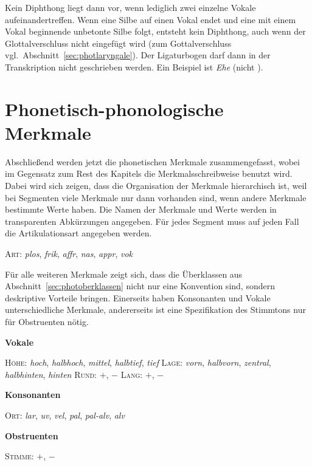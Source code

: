 Kein Diphthong liegt dann vor, wenn lediglich zwei einzelne Vokale aufeinandertreffen.
Wenn eine Silbe auf einen Vokal endet und eine mit einem Vokal beginnende unbetonte Silbe folgt, entsteht kein Diphthong, auch wenn der Glottalverschluss nicht eingefügt wird (zum Gottalverschluss vgl.\ Abschnitt~\ref{sec:photlaryngale}).
Der Ligaturbogen darf dann in der Transkription nicht geschrieben werden.
Ein Beispiel ist \textit{Ehe} \textipa{[Pe:@]} (nicht \Ast\textipa{[P\t{e@}]}).

\section{Phonetisch-phonologische Merkmale}

\label{sec:photpholmerkmale}

Abschließend werden jetzt die phonetischen Merkmale zusammengefasst, wobei im Gegensatz zum Rest des Kapitels die Merkmalsschreibweise benutzt wird.
Dabei wird sich zeigen, dass die Organisation der Merkmale hierarchisch ist, weil bei Segmenten viele Merkmale nur dann vorhanden sind, wenn andere Merkmale bestimmte Werte haben.
Die Namen der Merkmale und Werte werden in transparenten Abkürzungen angegeben.
Für jedes Segment muss auf jeden Fall die Artikulationsart angegeben werden.

\begin{exe}
	\ex \textsc{Art}: \textit{plos}, \textit{frik}, \textit{affr}, \textit{nas}, \textit{appr}, \textit{vok}
\end{exe}

Für alle weiteren Merkmale zeigt sich, dass die Überklassen aus Abschnitt~\ref{sec:photoberklassen} nicht nur eine Konvention sind, sondern deskriptive Vorteile bringen.
Einerseits haben Konsonanten und Vokale unterschiedliche Merkmale, andererseits ist eine Spezifikation des Stimmtons nur für Obstruenten nötig.

\begin{exe}
	\ex \textbf{Vokale}
		\begin{xlist}
			\ex \textsc{Höhe}: \textit{hoch}, \textit{halbhoch}, \textit{mittel}, \textit{halbtief}, \textit{tief}
			\ex \textsc{Lage}: \textit{vorn}, \textit{halbvorn}, \textit{zentral}, \textit{halbhinten}, \textit{hinten}
			\ex \textsc{Rund}: $+$, $-$
			\ex \textsc{Lang}: $+$, $-$
		\end{xlist}
	\ex \textbf{Konsonanten}
		\begin{xlist}
			\ex \textsc{Ort}: \textit{lar}, \textit{uv}, \textit{vel}, \textit{pal}, \textit{pal-alv}, \textit{alv}
		\end{xlist}
	\ex \textbf{Obstruenten}
		\begin{xlist}
			\ex \textsc{Stimme}: $+$, $-$
		\end{xlist}
\end{exe}

